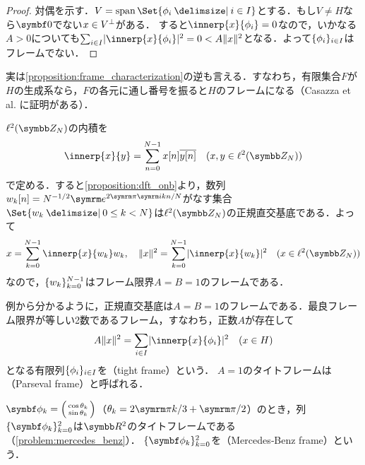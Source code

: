 \documentclass[../../main]{subfiles}
\begin{document}
\begin{proof}
  対偶を示す．\(V=\spannedby\Set{\phi_i\given i\in I}\)とする．もし\(V\neq H\)なら\(\zvec\)でない\(x\in\pcomp{V}\)がある．
  すると\(\innerp{x}{\phi_i}=0\)なので，いかなる\(A>0\)についても\(\sum_{i\in I}\abs{\innerp{x}{\phi_i}}^2=0<A\vnorm{x}^2\)となる．よって\(\lbrace\phi_i\rbrace_{i\in I}\)はフレームでない．
\end{proof}

\begin{note}
  実は\cref{proposition:frame_characterization}の逆も言える．すなわち，有限集合\(F\)が\(H\)の生成系なら，\(F\)の各元に通し番号を振ると\(H\)のフレームになる（Casazza et al. \cite{casazza2013}に証明がある）．
\end{note}

\begin{example}
  \(\cycles{N}\)の内積を
  \[
    \innerp{x}{y} = \sum_{n=0}^{N-1}x[n]\conj*{y[n]}\quad(x,y\in\cycles{N})
  \]
  で定める．すると\cref{proposition:dft_onb}より，数列\(w_k[n]=N^{-1/2}\napr^{2\krez\iuni kn/N}\)がなす集合\(\Set{w_k\given 0\leq k<N}\)は\(\cycles{N}\)の正規直交基底である．よって
  \[
    x = \sum_{k=0}^{N-1}\innerp{x}{w_k}w_k,
    \quad\vnorm{x}^2 = \sum_{k=0}^{N-1}\abs{\innerp{x}{w_k}}^2\quad(x\in\cycles{N})
  \]
  なので，\(\lbrace w_k\rbrace_{k=0}^{N-1}\)はフレーム限界\(A=B=1\)のフレームである．
\end{example}

例から分かるように，正規直交基底は\(A=B=1\)のフレームである．最良フレーム限界が等しい2数であるフレーム，すなわち，正数\(A\)が存在して
\[
  A\vnorm{x}^2 = \sum_{i\in I}\abs{\innerp{x}{\phi_i}}^2\quad(x\in H)
\]
となる有限列\(\lbrace\phi_i\rbrace_{i\in I}\)を（tight frame）という．
\(A=1\)のタイトフレームは（Parseval frame）と呼ばれる．

\begin{example}
  \(\vect{\phi}_k=\smallmatrice{\cos\theta_k \\ \sin\theta_k}\)（\(\theta_k=2\krez k/3+\krez/2\)）のとき，列\(\seq{\vect{\phi}_k}_{k=0}^2\)は\(\numset{R}^2\)のタイトフレームである（\cref{problem:mercedes_benz}）．
  \(\seq{\vect{\phi}_k}_{k=0}^2\)を（Mercedes‐Benz frame）という\cite{casazza2013}．
\end{example}
\end{document}
